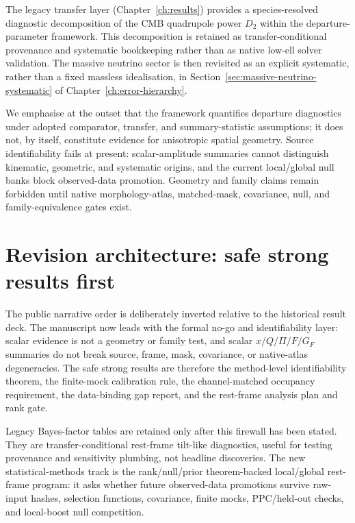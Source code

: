 The legacy transfer layer
(Chapter~\ref{ch:results}) provides a species-resolved diagnostic
decomposition of the CMB quadrupole power $D_2$ within the
departure-parameter framework.  This decomposition is retained as
transfer-conditional provenance and systematic bookkeeping rather than
as native low-ell solver validation.  The massive neutrino sector is
then revisited as an explicit systematic, rather than a fixed massless
idealisation, in Section~\ref{sec:massive-neutrino-systematic} of
Chapter~\ref{ch:error-hierarchy}.

We emphasise at the outset that the framework quantifies
departure diagnostics under adopted comparator, transfer, and
summary-statistic assumptions; it does not, by itself,
constitute evidence for anisotropic spatial geometry.  Source
identifiability fails at present: scalar-amplitude summaries
cannot distinguish kinematic, geometric, and systematic
origins, and the current local/global null banks block
observed-data promotion.  Geometry and family claims remain
forbidden until native morphology-atlas, matched-mask,
covariance, null, and family-equivalence gates exist.





\section{Revision architecture: safe strong results first}
\label{sec:revision-architecture}

The public narrative order is deliberately inverted relative to
the historical result deck.  The manuscript now leads with the
formal no-go and identifiability layer: scalar evidence is not a
geometry or family test, and scalar $x/Q/\Pi/F/G_F$ summaries do
not break source, frame, mask, covariance, or native-atlas
degeneracies.  The safe strong results are therefore the
method-level identifiability theorem, the finite-mock calibration
rule, the channel-matched occupancy requirement, the data-binding
gap report, and the rest-frame analysis plan and rank gate.

Legacy Bayes-factor tables are retained only after this firewall
has been stated.  They are transfer-conditional rest-frame
tilt-like diagnostics, useful for testing provenance and
sensitivity plumbing, not headline discoveries.  The new
statistical-methods track is the rank/null/prior
theorem-backed local/global rest-frame program: it asks whether
future observed-data promotions survive raw-input hashes,
selection functions, covariance, finite mocks, PPC/held-out
checks, and local-boost null competition.

